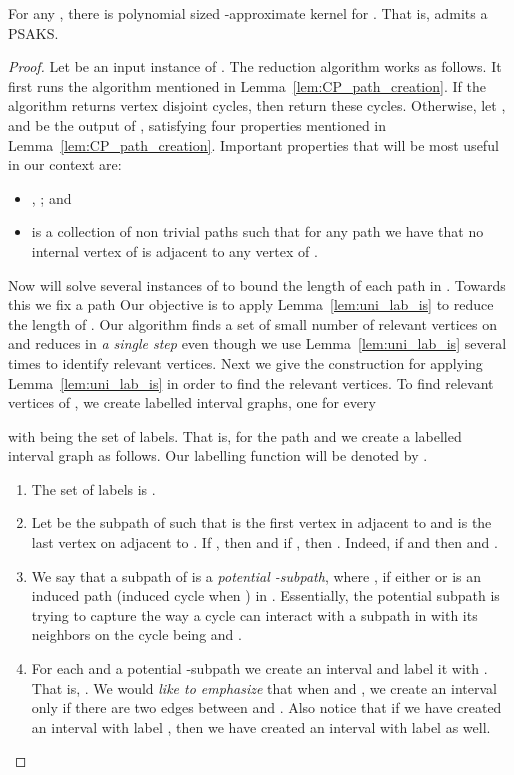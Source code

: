 \begin{theorem}
\label{thm:CPapprx}
For any , there is polynomial sized -approximate kernel for \CP. That is, \CP{} admits a PSAKS. 
\end{theorem}
\begin{proof}
Let  be an input instance of \CP.  
The reduction algorithm  works as follows. It first runs the algorithm  mentioned in Lemma~\ref{lem:CP_path_creation}. If the algorithm returns  vertex disjoint cycles, then  return these cycles. Otherwise, let ,  and  be the output of , satisfying four properties mentioned in Lemma~\ref{lem:CP_path_creation}. Important properties that will be most useful in our context are: 


\begin{itemize}
\setlength{\itemsep}{-2pt}
\item , ; and 
\item   is a collection  of non trivial  
paths such that for any path  we have that no internal vertex of  is adjacent to  
any vertex of .
\end{itemize}
\noindent 
Now  will solve several instances of  \shortULI{} to bound the length of each path in 
. Towards this we fix a path  
Our objective is to apply Lemma~\ref{lem:uni_lab_is} 
to reduce the length of . 
Our algorithm finds a set of small number of relevant vertices on  
and reduces  in {\em a single step} even though 
we use Lemma~\ref{lem:uni_lab_is} several times to identify relevant vertices.  Next we give the  construction for applying Lemma~\ref{lem:uni_lab_is} in order to find the relevant vertices. To find relevant vertices of , we create  labelled interval graphs, one for every 
  
with  being the set of labels. That is, for  the path  and  we create a  labelled interval graph  as follows. Our labelling function will be denoted by  .

\begin{enumerate}
\setlength{\itemsep}{-2pt}
\item The set of labels is . 
\item Let  be the subpath of  such that  is the first vertex in  adjacent to  and  is the last vertex on  adjacent to .  If , then  and if , then . Indeed, if  and  then  and . 
\item We say that a subpath  of  is a {\em potential -subpath}, 
where , if   
either  or  is an induced path (induced cycle when ) in . Essentially, the potential subpath is trying to capture the way a cycle can interact with a subpath in  with its neighbors on the cycle being  and .
\item For each  
and a potential -subpath  we create an interval  
 and  label it with . That is, . 
We would {\em like to emphasize} that when  and , we create an interval  only if 
there are two edges between  and .  
Also notice that if we have created an interval  with label , then we have created an interval  with label  as well.  
\end{enumerate}


\end{proof}
